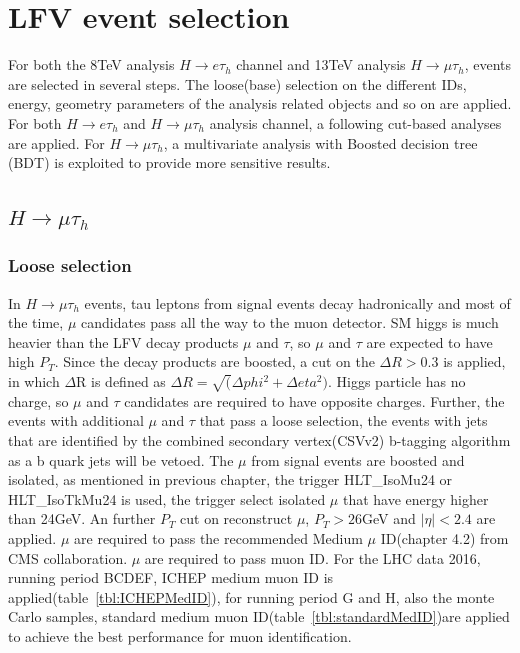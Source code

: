 %
%

\chapter{LFV event selection}
For both the 8TeV analysis $H\rightarrow e\tau_h$ channel and 13TeV analysis  $H\rightarrow\mu\tau_h$, events are selected in several steps. The loose(base) selection on the different IDs, energy, geometry parameters of the analysis related objects and so on are applied. For both  $H\rightarrow e\tau_h$ and $H\rightarrow\mu\tau_h$ analysis channel, a following cut-based analyses are applied. For $H\rightarrow\mu\tau_h$, a multivariate analysis with Boosted decision tree (BDT) is exploited to provide more sensitive results. 



\section{$H\rightarrow\mu\tau_h$}
\subsection{Loose selection}
In $H\rightarrow\mu\tau_h$ events, tau leptons from signal events decay hadronically and most of the time, $\mu$ candidates pass all the way to the muon detector. SM higgs is much heavier than the LFV decay products $\mu$ and $\tau$, so $\mu$ and $\tau$ are expected to have high $P_{T}$. Since the decay products are boosted, a cut on the $\Delta R>0.3$ is applied, in which $\Delta$R is defined as $\Delta R=\sqrt(\Delta phi^{2}+\Delta eta^{2})$. Higgs particle has no charge, so $\mu$ and $\tau$ candidates are required to have opposite charges. Further, the events with additional $\mu$ and $\tau$ that pass a loose selection, the events with jets that are identified by the combined secondary vertex(CSVv2) b-tagging algorithm \cite{btag_ago} as a b quark jets will be vetoed. The $\mu$ from signal events are boosted and isolated, as mentioned in previous chapter, the trigger HLT\_IsoMu24 or HLT\_IsoTkMu24 is used, the trigger select isolated $\mu$ that have energy higher than 24GeV. An further $P_{T}$ cut on reconstruct $\mu$,  $P_{T}>26$GeV and $|\eta|<2.4$ are applied. $\mu$ are required to pass the recommended Medium $\mu$ ID(chapter 4.2) from CMS collaboration. $\mu$ are required to pass muon ID. For the LHC data 2016, running period BCDEF, ICHEP medium muon ID is applied(table~\ref{tbl:ICHEPMedID}), for running period G and H, also the monte Carlo samples, standard medium muon ID(table~\ref{tbl:standardMedID})are applied to achieve the best performance for muon identification.

